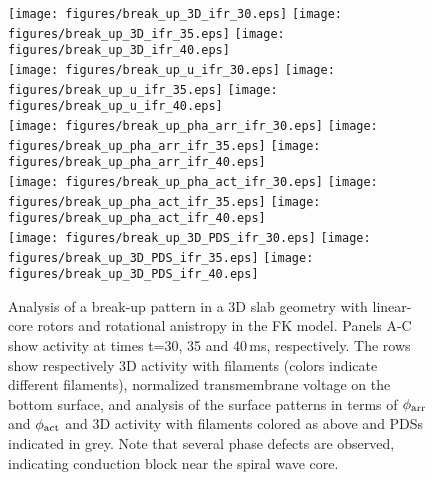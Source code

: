 \documentclass{article}
\newcommand{\phiact}{\ensuremath{\phi_{\rm act}}}
\newcommand{\phiarr}{\ensuremath{\phi_{\rm arr}}}
\begin{document}
\begin{figure}
    \centering
{} 
\texttt{[image: figures/break\_up\_3D\_ifr\_30.eps]}
\texttt{[image: figures/break\_up\_3D\_ifr\_35.eps]}
\texttt{[image: figures/break\_up\_3D\_ifr\_40.eps]}
\\ 
\texttt{[image: figures/break\_up\_u\_ifr\_30.eps]}
\texttt{[image: figures/break\_up\_u\_ifr\_35.eps]}
\texttt{[image: figures/break\_up\_u\_ifr\_40.eps]}
\\
\texttt{[image: figures/break\_up\_pha\_arr\_ifr\_30.eps]}
\texttt{[image: figures/break\_up\_pha\_arr\_ifr\_35.eps]}
\texttt{[image: figures/break\_up\_pha\_arr\_ifr\_40.eps]}
\\ 
\texttt{[image: figures/break\_up\_pha\_act\_ifr\_30.eps]}
\texttt{[image: figures/break\_up\_pha\_act\_ifr\_35.eps]}
\texttt{[image: figures/break\_up\_pha\_act\_ifr\_40.eps]}
\\
\texttt{[image: figures/break\_up\_3D\_PDS\_ifr\_30.eps]}
\hspace{0.3cm}
\texttt{[image: figures/break\_up\_3D\_PDS\_ifr\_35.eps]}
\hspace{0.3cm}
\texttt{[image: figures/break\_up\_3D\_PDS\_ifr\_40.eps]}

    \caption{Analysis of a break-up pattern in a 3D slab geometry with linear-core rotors and rotational anistropy in the FK model. Panels A-C show activity at times t=30, 35 and 40\,ms, respectively. The rows show respectively 3D activity with filaments (colors indicate different filaments),  normalized transmembrane voltage on the bottom surface, and analysis of the surface patterns in terms of $\phiarr$ and $\phiact$ and 3D activity with filaments colored as above and PDSs indicated in grey. Note that several phase defects are observed, indicating conduction block near the spiral wave core.}
    \label{fig:breakup}
\end{figure}
\end{document}
